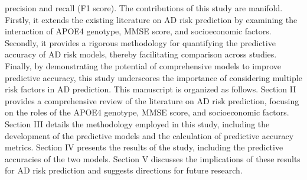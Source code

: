 \documentclass[conference]{IEEEtran}
\begin{document}
precision and recall (F1 score). The contributions of this study are manifold. Firstly, it extends the existing literature on AD risk prediction by examining the interaction of APOE4 genotype, MMSE score, and socioeconomic factors. Secondly, it provides a rigorous methodology for quantifying the predictive accuracy of AD risk models, thereby facilitating comparison across studies. Finally, by demonstrating the potential of comprehensive models to improve predictive accuracy, this study underscores the importance of considering multiple risk factors in AD prediction. This manuscript is organized as follows. Section II provides a comprehensive review of the literature on AD risk prediction, focusing on the roles of the APOE4 genotype, MMSE score, and socioeconomic factors. Section III details the methodology employed in this study, including the development of the predictive models and the calculation of predictive accuracy metrics. Section IV presents the results of the study, including the predictive accuracies of the two models. Section V discusses the implications of these results for AD risk prediction and suggests directions for future research.
\end{document}
